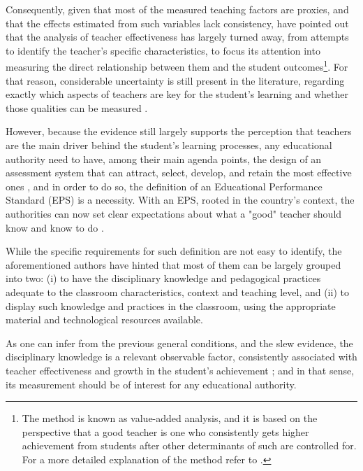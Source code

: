 Consequently, given that most of the measured teaching factors are proxies, and that the effects estimated from such variables lack consistency, \citet{Hanushek_et_al_2012} have pointed out that the analysis of teacher effectiveness has largely turned away, from attempts to identify the teacher's specific characteristics, to focus its attention into measuring the direct relationship between them and the student outcomes\footnote{The method is known as value-added analysis, and it is based on the perspective that a good teacher is one who consistently gets higher achievement from students after other determinants of such are controlled for. For a more detailed explanation of the method refer to \citet{Scherrer_2011}.}. For that reason, considerable uncertainty is still present in the literature, regarding exactly which aspects of teachers are key for the student's learning and whether those qualities can be measured \citep{Rockoff_2004, Clotfelter_et_al_2006}.

However, because the evidence still largely supports the perception that teachers are the main driver behind the student's learning processes, any educational authority need to have, among their main agenda points, the design of an assessment system that can attract, select, develop, and retain the most effective ones \citep{Elacqua_et_al_2018}, and in order to do so, the definition of an Educational Performance Standard (EPS) is a necessity. With an EPS, rooted in the country's context, the authorities can now set clear expectations about what a "good" teacher should know and know to do \citep{Hincapie_et_al_2020}. 

While the specific requirements for such definition are not easy to identify, the aforementioned authors have hinted that most of them can be largely grouped into two: (i) to have the disciplinary knowledge and pedagogical practices adequate to the classroom characteristics, context and teaching level, and (ii) to display such knowledge and practices in the classroom, using the appropriate material and technological resources available. 

As one can infer from the previous general conditions, and the slew evidence, the disciplinary knowledge is a relevant observable factor, consistently associated with teacher effectiveness and growth in the student's achievement \citep{Santibanez_2006, Clotfelter_et_al_2006, Clotfelter_et_al_2007, Hanushek_et_al_2006, Marshall_2009, Rockoff_et_al_2011, Kane_et_al_2011, Kane_et_al_2012, Ome_2012, Metzler_et_al_2012, Kane_et_al_2013, Araujo_et_al_2016, Bietenbeck_et_al_2018, Estrada_2019}; and in that sense, its measurement should be of interest for any educational authority.

